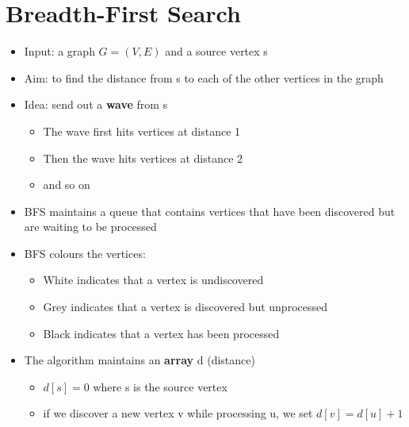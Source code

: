 \documentclass{article}[18pt]
\begin{document}
\section{Breadth-First Search}
\begin{itemize}
	\item Input: a graph $G=(V,E)$ and a source vertex s
	\item Aim: to find the distance from s to each of the other vertices in the graph
	\item Idea: send out a \textbf{wave} from s
	\begin{itemize}
		\item The wave first hits vertices at distance 1
		\item Then the wave hits vertices at distance 2
		\item and so on
	\end{itemize}
	\item BFS maintains a queue that contains vertices that have been discovered but are waiting to be processed
	\item BFS colours the vertices:
	\begin{itemize}
		\item White indicates that a vertex is undiscovered
		\item Grey indicates that a vertex is discovered but unprocessed
		\item Black indicates that a vertex has been processed
	\end{itemize}
	\item The algorithm maintains an \textbf{array} d (distance)
	\begin{itemize}
		\item $d[s]=0$ where s is the source vertex
		\item if we discover a new vertex v while processing u, we set $d[v]=d[u]+1$
	\end{itemize}
\end{itemize}
\end{document}
